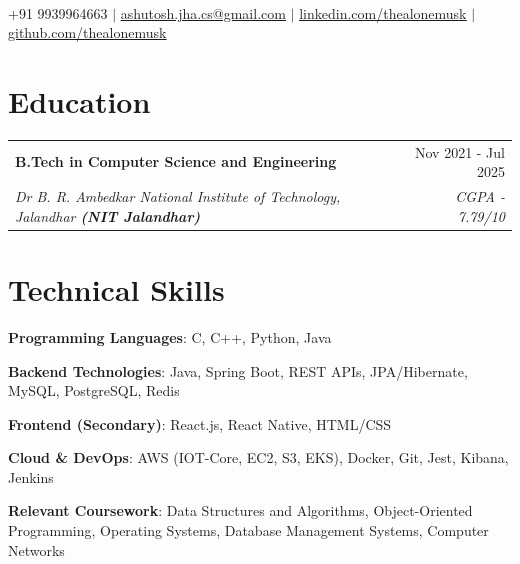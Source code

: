 \documentclass[letterpaper,10pt]{article}
\makeatletter
\newcommand{\resumeSubheading}[4]{
  \vspace{-2pt}\item
    \begin{tabular*}{0.97\textwidth}[t]{l@{\extracolsep{\fill}}r}
      \textbf{#1} & #2 \\
      \textit{\small#3} & \textit{\small #4} \\
    \end{tabular*}\vspace{-7pt}
}
\makeatother
\begin{document}
\begin{center}
    \textbf{} \\ \vspace{5pt}
    \small +91 9939964663 $|$ \href{mailto:ashutosh.jha.cs@gmail.com}{\underline{ashutosh.jha.cs@gmail.com}} $|$ 
    \href{https://www.linkedin.com/in/thealonemusk/}{\underline{linkedin.com/thealonemusk}} $|$
    \href{https://github.com/thealonemusk}{\underline{github.com/thealonemusk}}
\end{center}

\section{Education}
 
\resumeSubheading
  {B.Tech in Computer Science and Engineering }{Nov 2021 - Jul 2025}
  {Dr B. R. Ambedkar National Institute of Technology, Jalandhar \textbf{(NIT Jalandhar) }} {CGPA - 7.79/10}
\section{Technical Skills}

\begin{itemize}
  \small{
    \item \textbf{Programming Languages}: C, C++, Python, Java
    \item \textbf{Backend Technologies}: Java, Spring Boot, REST APIs, JPA/Hibernate, MySQL, PostgreSQL, Redis

\item \textbf{Frontend (Secondary)}: React.js, React Native, HTML/CSS
    \item \textbf{Cloud \& DevOps}: AWS (IOT-Core, EC2, S3, EKS), Docker, Git, Jest, Kibana, Jenkins
    \item \textbf{Relevant Coursework}: Data Structures and Algorithms, Object-Oriented Programming, Operating Systems, Database Management Systems, Computer Networks
  }
\end{itemize}

\end{document}
